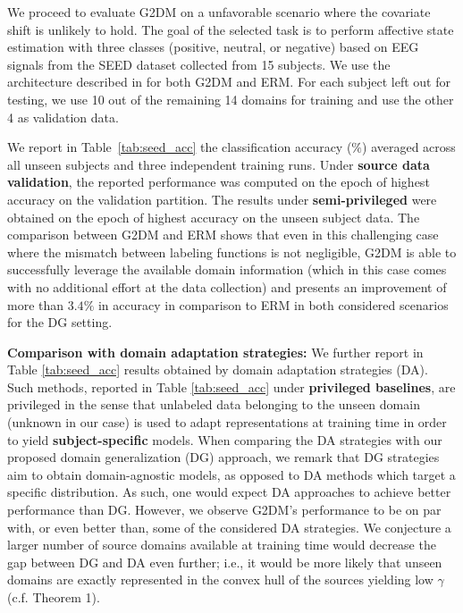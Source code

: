 \documentclass{article}
\begin{document}
We proceed to evaluate G2DM on a unfavorable scenario where the covariate shift is unlikely to hold. The goal of the selected task is to perform affective state estimation with three classes (positive, neutral, or negative) based on EEG signals from the SEED dataset \cite{zheng2015investigating} collected from 15 subjects. We use the architecture described in \cite{li2017targeting} for both G2DM and ERM. For each subject left out for testing, we use 10 out of the remaining 14 domains for training and use the other 4 as validation data.

We report in Table~\ref{tab:seed_acc} the classification accuracy ($\%$) averaged across all unseen subjects and three independent training runs. Under \textbf{source data validation}, the reported performance was computed on the epoch of highest accuracy on the validation partition. The results under \textbf{semi-privileged} were obtained on the epoch of highest accuracy on the unseen subject data. The comparison between G2DM and ERM shows that even in this challenging case where the mismatch between labeling functions is not negligible, G2DM is able to successfully leverage the available domain information (which in this case comes with no additional effort at the data collection) and presents an improvement of more than $3.4\%$ in accuracy in comparison to ERM in both considered scenarios for the DG setting. 

\textbf{Comparison with domain adaptation strategies:} We further report in Table \ref{tab:seed_acc} results obtained by domain adaptation strategies (DA). Such methods, reported in Table \ref{tab:seed_acc} under \textbf{privileged baselines}, are privileged in the sense that unlabeled data belonging to the unseen domain (unknown in our case) is used to adapt representations at training time in order to yield \textbf{subject-specific} models. When comparing the DA strategies with our proposed domain generalization (DG) approach, we remark that DG strategies aim to obtain domain-agnostic models, as opposed to DA methods which target a specific distribution. As such, one would expect DA approaches to achieve better performance than DG. However, we observe G2DM's performance to be on par with, or even better than, some of the considered DA strategies. We conjecture a larger number of source domains available at training time would decrease the gap between DG and DA even further; i.e., it would be more likely that unseen domains are exactly represented in the convex hull of the sources yielding low $\gamma$ (c.f. Theorem 1).
\end{document}
